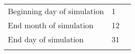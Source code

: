 \begin{table}[h!]
\begin{tabular}{|p{1.25in}|p{0.75in}|p{4in}|}
\\ 
Beginning day of simulation                                                               & 1                      &                                                                                                                                                                                                                                                                                                                                                                                                                                                                                                                                                                          \\
End month of simulation                                                                   & 12                     &                                                                                                                                                                                                                                                                                                                                                                                                                                                                                                                                                                          \\
End day of simulation                                                                     & 31                     & 

                                                                                  
                                                                                  \\
                                                                                    
                                              \\ \hline

\end{tabular}
\end{table}